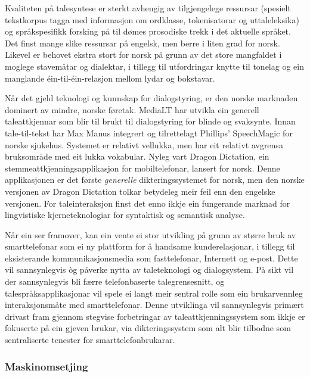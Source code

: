 \begin{multicols}{2}

Kvaliteten på talesyntese er sterkt avhengig av tilgjengelege ressursar (spesielt tekstkorpus tagga med informasjon om ordklasse, tokenisatorar og uttaleleksika) og språkspesifikk forsking på til dømes prosodiske trekk i det aktuelle språket. 
Det finst mange slike ressursar på engelsk, men berre i liten grad for norsk. Likevel er behovet ekstra stort for norsk på grunn av det store mangfaldet i moglege stavemåtar og dialektar, i tillegg til utfordringar knytte til tonelag og ein manglande éin-til-éin-relasjon mellom lydar og bokstavar. 

Når det gjeld teknologi og kunnskap for dialogstyring, er den norske marknaden dominert av mindre, norske føretak. 
MediaLT har utvikla ein generell taleattkjennar som blir til brukt til dialogstyring for blinde og svaksynte. 
Innan tale-til-tekst har Max Manus integrert og tilrettelagt Phillips’ SpeechMagic for norske sjukehus. 
Systemet er relativt vellukka, men har eit relativt avgrensa bruksområde med eit lukka vokabular. 
Nyleg vart Dragon Dictation, ein stemmeattkjenningsapplikasjon for mobiltelefonar, lansert for norsk. 
Denne applikasjonen er det første \textit{generelle} dikteringssystemet for norsk, men den norske versjonen av Dragon Dictation tolkar betydeleg meir feil enn den engelske versjonen. 
For taleinteraksjon finst det enno ikkje ein fungerande marknad for lingvistiske kjerneteknologiar for syntaktisk og semantisk analyse. 

Når ein ser framover, kan ein vente ei stor utvikling på grunn av større bruk av smarttelefonar som ei ny plattform for å handsame kunderelasjonar, i tillegg til eksisterande kommunikasjonsmedia som fasttelefonar, Internett og e-post. 
Dette vil sannsynlegvis òg påverke nytta av taleteknologi og dialogsystem. På sikt vil der sannsynlegvis bli færre telefonbaserte talegrensesnitt, og talespråksapplikasjonar vil spele ei langt meir sentral rolle som ein brukarvennleg interaksjonsmåte med smarttelefonar. 
Denne utviklinga vil sannsynlegvis primært drivast fram gjennom stegvise forbetringar av taleattkjenningssystem som ikkje er fokuserte på ein gjeven brukar, via dikteringssystem som alt blir tilbodne som sentraliserte tenester for smarttelefonbrukarar. 

\subsubsection{Maskinomsetjing}


\end{multicols}
